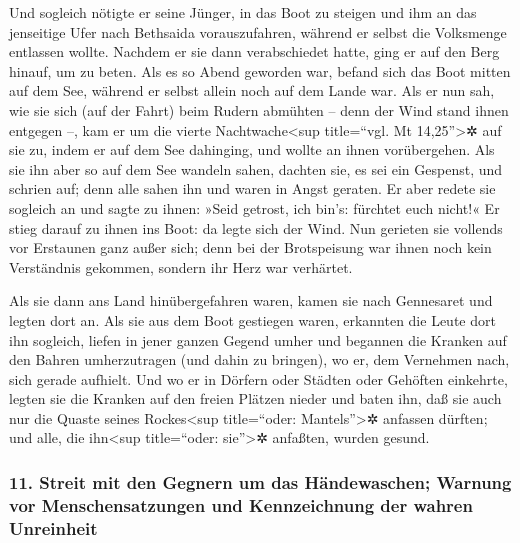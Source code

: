  Und sogleich nötigte er seine Jünger, in das Boot zu
steigen und ihm an das jenseitige Ufer nach Bethsaida vorauszufahren,
während er selbst die Volksmenge entlassen wollte. 
Nachdem er sie dann verabschiedet hatte, ging er auf den Berg hinauf, um
zu beten.  Als es so Abend geworden war, befand sich das
Boot mitten auf dem See, während er selbst allein noch auf dem Lande
war.  Als er nun sah, wie sie sich (auf der Fahrt) beim
Rudern abmühten -- denn der Wind stand ihnen entgegen --, kam er um die
vierte Nachtwache\textless sup title=``vgl. Mt 14,25''\textgreater✲ auf
sie zu, indem er auf dem See dahinging, und wollte an ihnen
vorübergehen.  Als sie ihn aber so auf dem See wandeln
sahen, dachten sie, es sei ein Gespenst, und schrien auf;
 denn alle sahen ihn und waren in Angst geraten. Er aber
redete sie sogleich an und sagte zu ihnen: »Seid getrost, ich bin's:
fürchtet euch nicht!«  Er stieg darauf zu ihnen ins Boot:
da legte sich der Wind. Nun gerieten sie vollends vor Erstaunen ganz
außer sich;  denn bei der Brotspeisung war ihnen noch
kein Verständnis gekommen, sondern ihr Herz war verhärtet.

 Als sie dann ans Land hinübergefahren waren, kamen sie
nach Gennesaret und legten dort an.  Als sie aus dem Boot
gestiegen waren, erkannten die Leute dort ihn sogleich, 
liefen in jener ganzen Gegend umher und begannen die Kranken auf den
Bahren umherzutragen (und dahin zu bringen), wo er, dem Vernehmen nach,
sich gerade aufhielt.  Und wo er in Dörfern oder Städten
oder Gehöften einkehrte, legten sie die Kranken auf den freien Plätzen
nieder und baten ihn, daß sie auch nur die Quaste seines
Rockes\textless sup title=``oder: Mantels''\textgreater✲ anfassen
dürften; und alle, die ihn\textless sup title=``oder: sie''\textgreater✲
anfaßten, wurden gesund.

\hypertarget{streit-mit-den-gegnern-um-das-huxe4ndewaschen-warnung-vor-menschensatzungen-und-kennzeichnung-der-wahren-unreinheit}{%
\subsubsection{11. Streit mit den Gegnern um das Händewaschen; Warnung
vor Menschensatzungen und Kennzeichnung der wahren
Unreinheit}\label{streit-mit-den-gegnern-um-das-huxe4ndewaschen-warnung-vor-menschensatzungen-und-kennzeichnung-der-wahren-unreinheit}}

